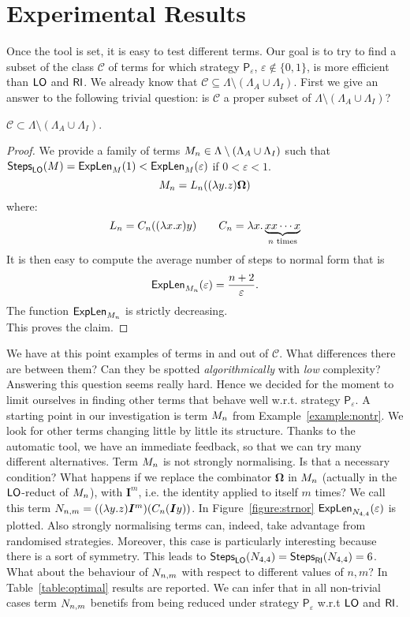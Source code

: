 \section{Experimental Results}
Once the tool is set, it is easy to test different terms. Our goal is to try to find a subset of the class $\mathcal{C}$ of terms for which strategy $\mathsf{P}_\varepsilon$, $\varepsilon\not\in\{0,1\}$, is more efficient than $\textsf{LO}$ and $\textsf{RI}$. We already know that $\mathcal{C}\subseteq\Lambda\setminus(\Lambda_A\cup\Lambda_I)$. First we give an answer to the following trivial question: is $\mathcal{C}$ a proper subset of $\Lambda\setminus(\Lambda_A\cup\Lambda_I)$?
\begin{proposition}\label{prop:strict}
	$\mathcal{C}\subset\Lambda\setminus(\Lambda_A\cup\Lambda_I)$.
\end{proposition}
\begin{proof}
	We provide a family of terms $M_n\in\Lambda\setminus(\Lambda_A\cup\Lambda_I)$ such that $\textsf{Steps}_{\textsf{LO}}(M)=\textsf{ExpLen}_{M}(1)<\textsf{ExpLen}_{M}(\varepsilon)$ if $0<\varepsilon<1$.
	$$
	M_n=L_n((\lambda y.z)\bm{\Omega})
	$$
	where:
	$$
	L_n = C_n((\lambda x.x)y)\qquad
	C_n = \lambda  x.\underbrace{xx\cdots x}_{n\text{ times}}
	$$
	It is then easy to compute the average number of steps to normal form that is
	$$
	\textsf{ExpLen}_{M_n}(\varepsilon)=\frac{n+2}{\varepsilon}.
	$$ 
	The function $\textsf{ExpLen}_{M_n}$ is strictly decreasing.\\
	This proves the claim.
\end{proof}
We have at this point examples of terms in and out of $\mathcal{C}$. What differences there are between them? Can they be spotted \emph{algorithmically} with \emph{low} complexity? Answering this question seems really hard. Hence we decided for the moment to limit ourselves in finding other terms that behave well w.r.t. strategy $\mathsf{P}_\varepsilon$. A starting point in our investigation is term $M_n$ from Example~\ref{example:nontr}. We look for other terms changing little by little its structure. Thanks to the automatic tool, we have an immediate feedback, so that we can try many different alternatives. Term $M_n$ is not strongly normalising. Is that a necessary condition? What happens if we replace the combinator $\bm{\Omega}$ in $M_n$ (actually in the $\textsf{LO}$-reduct of $M_n$), with $\mathbf{I}^m$, i.e. the identity applied to itself $m$ times? We call this term $N_{n,m}=((\lambda y.z)\bm{I}^m) (C_n(\bm{I}y))$. In Figure~\ref{figure:strnor} $\textsf{ExpLen}_{N_{4,4}}(\varepsilon)$ is plotted. Also strongly normalising terms can, indeed, take advantage from randomised strategies. Moreover, this case is particularly interesting because there is a sort of symmetry. This leads to $\textsf{Steps}_{\textsf{LO}}(N_{4,4})=\textsf{Steps}_{\textsf{RI}}(N_{4,4})=6$. What about the behaviour of $N_{n,m}$ with respect to different values of $n,m$? In Table~\ref{table:optimal} results are reported. We can infer that in all non-trivial cases term $N_{n,m}$ benetifs from being reduced under strategy $\mathsf{P}_\varepsilon$ w.r.t $\textsf{LO}$ and $\textsf{RI}$.
